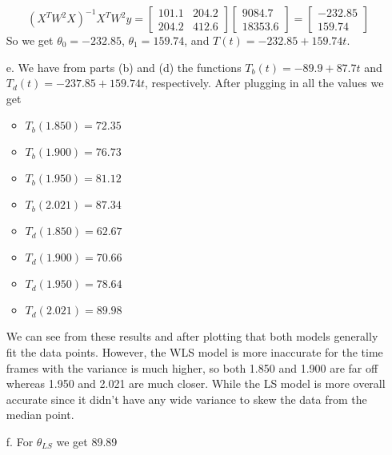\documentclass[12pt]{article}
\begin{document}
\begin{enumerate}
\[	(X^{T}W^{2}X)^{-1}X^{T}W^{2}y = \begin{bmatrix}
	101.1 & 204.2 \\
	204.2 & 412.6
	\end{bmatrix}
	\begin{bmatrix}
	9084.7 \\ 18353.6
	\end{bmatrix}	
	= \begin{bmatrix}
	-232.85 \\ 159.74
	\end{bmatrix}	
	\]
	So we get $\theta_{0} = -232.85$, $\theta_{1} = 159.74$, and $T(t) = -232.85+159.74t$.
	\item[e.] We have from parts (b) and (d) the functions $T_{b}(t) = -89.9+87.7t$ and $T_{d}(t) = -237.85 + 159.74t$, respectively.
	After plugging in all the values we get
	\begin{itemize}
		\item $T_{b}(1.850) = 72.35$
		\item $T_{b}(1.900) = 76.73$
		\item $T_{b}(1.950) = 81.12$
		\item $T_{b}(2.021) = 87.34$
		
		\item $T_{d}(1.850) = 62.67$
		\item $T_{d}(1.900) = 70.66$
		\item $T_{d}(1.950) = 78.64$
		\item $T_{d}(2.021) = 89.98$
	\end{itemize}
	
	We can see from these results and after plotting that both models generally fit the data points.
	However, the WLS model is more inaccurate for the time frames with the variance is much higher, so both 1.850 and 1.900 are far off whereas 1.950 and 2.021 are much closer.
	While the LS model is more overall accurate since it didn't have any wide variance to skew the data from the median point.
	
	\item[f.] 
	For $\theta_{LS}$ we get 89.89
	

\end{enumerate}
\end{document}
